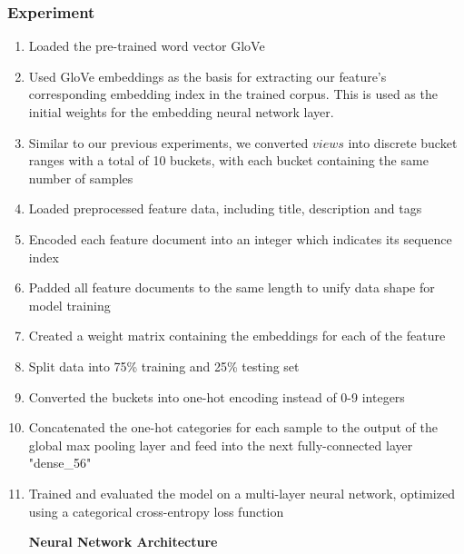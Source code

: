 \documentclass[english]{article}
\begin{document}
\subsubsection{Experiment}
\begin{enumerate}
    \item Loaded the pre-trained word vector GloVe
    \item Used GloVe embeddings as the basis for extracting our feature's corresponding embedding index in the trained corpus. This is used as the initial weights for the embedding neural network layer. 
    \item Similar to our previous experiments, we converted $views$ into discrete bucket ranges with a total of 10 buckets, with each bucket containing the same number of samples
    \item Loaded preprocessed feature data, including title, description and tags
    \item Encoded each feature document into an integer which indicates its sequence index
    \item Padded all feature documents to the same length to unify data shape for model training
    \item Created a weight matrix containing the embeddings for each of the feature 
    \item Split data into 75\% training and 25\% testing set
    \item Converted the buckets into one-hot encoding instead of 0-9 integers
    \item Concatenated the one-hot categories for each sample to the output of the global max pooling layer and feed into the next fully-connected layer "dense\_56"
    \item Trained and evaluated the model on a multi-layer neural network, optimized using a categorical cross-entropy loss function
    
    \noindent \textbf{Neural Network Architecture}
    
    

\end{enumerate}
\end{document}
